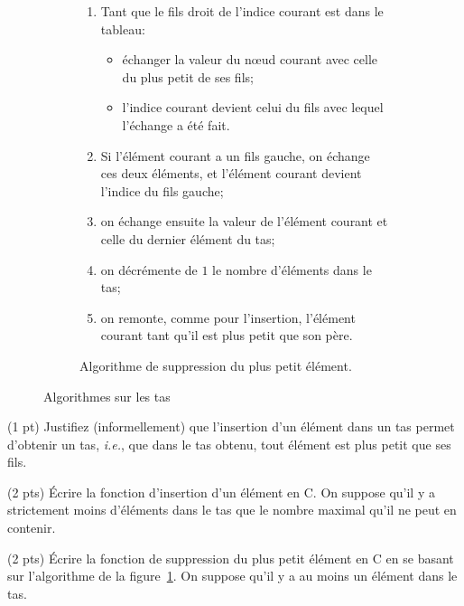 \begin{figure}
\begin{subfigure}[t]{0.45\textwidth}
{{\begin{enumerate}
          vaut $0$;
        \item Tant que le fils droit de l'indice courant est dans le
          tableau:
          \begin{itemize}
          \item {\'e}changer la valeur du n\oe ud courant avec celle du plus
            petit de ses fils;
          \item l'indice courant devient celui du fils avec lequel
            l'{\'e}change a {\'e}t{\'e} fait.
          \end{itemize}
        \item Si l'{\'e}l{\'e}ment courant a un fils gauche, on {\'e}change ces deux
          {\'e}l{\'e}ments, et l'{\'e}l{\'e}ment courant devient l'indice du fils gauche;
        \item on {\'e}change ensuite la valeur de l'{\'e}l{\'e}ment courant et celle
          du dernier {\'e}l{\'e}ment du tas;
        \item on d{\'e}cr{\'e}mente de $1$ le nombre d'{\'e}l{\'e}ments dans le tas;
        \item on remonte, comme pour l'insertion, l'{\'e}l{\'e}ment courant tant
          qu'il est plus petit que son p{\`e}re.  
        \end{enumerate}}\quad}
    \caption{Algorithme de suppression du plus petit {\'e}l{\'e}ment.}
    \label{fig:tas:suppression}
  \end{subfigure}
  \label{fig:tas:algos}
  \caption{Algorithmes sur les tas}
\end{figure}

\question (1 pt) Justifiez (informellement) que l'insertion d'un
{\'e}l{\'e}ment dans un tas permet d'obtenir un tas, \textit{i.e.}, que dans
le tas obtenu, tout {\'e}l{\'e}ment est plus petit que ses fils.

\question (2 pts) {\'E}crire la fonction d'insertion d'un {\'e}l{\'e}ment en C. On suppose
qu'il y a strictement moins d'{\'e}l{\'e}ments dans le tas que le nombre
maximal qu'il ne peut en contenir.

\question (2 pts) {\'E}crire la fonction de suppression du plus petit
{\'e}l{\'e}ment en C en se basant sur l'algorithme de la
figure~\ref{fig:tas:suppression}. On suppose qu'il y a au moins un
{\'e}l{\'e}ment dans le tas.


